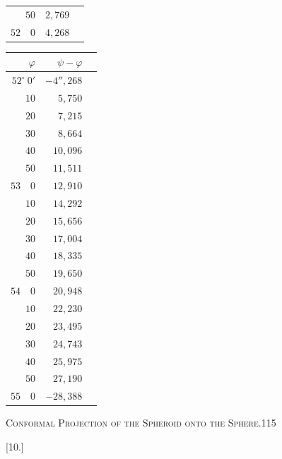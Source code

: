 \begin{center}
\begin{tabular}[t]{|r|r|r|}
$50$&$2{,}769$&\raisebox{-.7\baselineskip}{\small$1{,}499$}\\
$52\quad0$&$4{,}268$&
\end{tabular}\qquad
\begin{tabular}[t]{|r|r|r|}
\hline
$\varphi$&$\psi-\varphi$&\\\hline\hline
$52^\circ\ 0'$&$-4''{,}268$&\raisebox{-.7\baselineskip}{\small$1{,}482$}\\
$10$&$5{,}750$&\raisebox{-.7\baselineskip}{\small$1{,}465$}\\
$20$&$7{,}215$&\raisebox{-.7\baselineskip}{\small$1{,}449$}\\
$30$&$8{,}664$&\raisebox{-.7\baselineskip}{\small$1{,}432$}\\
$40$&$10{,}096$&\raisebox{-.7\baselineskip}{\small$1{,}415$}\\
$50$&$11{,}511$&\raisebox{-.7\baselineskip}{\small$1{,}399$}\\
$53\quad0$&$12{,}910$&\raisebox{-.7\baselineskip}{\small$1{,}382$}\\
$10$&$14{,}292$&\raisebox{-.7\baselineskip}{\small$1{,}364$}\\
$20$&$15{,}656$&\raisebox{-.7\baselineskip}{\small$1{,}348$}\\
$30$&$17{,}004$&\raisebox{-.7\baselineskip}{\small$1{,}331$}\\
$40$&$18{,}335$&\raisebox{-.7\baselineskip}{\small$1{,}315$}\\
$50$&$19{,}650$&\raisebox{-.7\baselineskip}{\small$1{,}298$}\\
$54\quad0$&$20{,}948$&\raisebox{-.7\baselineskip}{\small$1{,}282$}\\
$10$&$22{,}230$&\raisebox{-.7\baselineskip}{\small$1{,}265$}\\
$20$&$23{,}495$&\raisebox{-.7\baselineskip}{\small$1{,}248$}\\
$30$&$24{,}743$&\raisebox{-.7\baselineskip}{\small$1{,}232$}\\
$40$&$25{,}975$&\raisebox{-.7\baselineskip}{\small$1{,}215$}\\
$50$&$27{,}190$&\raisebox{-.7\baselineskip}{\small$1{,}198$}\\
$55\quad0$&$-28{,}388$&
\end{tabular}
\par\endgroup
\end{center}
\clearpage
\noindent\mbox{}\hfill{\small\textsc{Conformal Projection of the Spheroid onto the Sphere.}}\hfill115\par\bigskip
\begin{center}[10.]\end{center}
